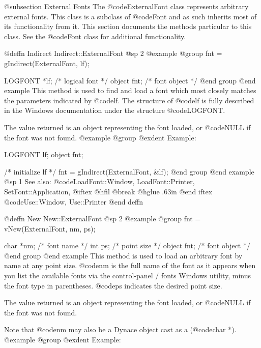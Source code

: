 @subsection External Fonts
The @code{ExternalFont} class represents arbitrary external fonts.  This
class is a subclass of @code{Font} and as such inherits most of its
functionality from it.  This section documents the methods particular to
this class.  See the @code{Font} class for additional functionality.









@deffn {Indirect} Indirect::ExternalFont
@sp 2
@example
@group
fnt = gIndirect(ExternalFont, lf);

LOGFONT *lf;    /*  logical font  */
object  fnt;    /*  font object   */
@end group
@end example
This method is used to find and load a font which most closely matches
the parameters indicated by @code{lf}.  The structure of @code{lf} is
fully described in the Windows documentation under the structure
@code{LOGFONT}.

The value returned is an object representing the font loaded, or
@code{NULL} if the font was not found.
@example
@group
@exdent Example:

LOGFONT lf;
object  fnt;

/*  initialize lf  */
fnt = gIndirect(ExternalFont, &lf);
@end group
@end example
@sp 1
See also:  @code{LoadFont::Window, LoadFont::Printer, SetFont::Application,}
@iftex
@hfil @break @hglue .63in 
@end iftex
@code{Use::Window, Use::Printer}
@end deffn










@deffn {New} New::ExternalFont
@sp 2
@example
@group
fnt = vNew(ExternalFont, nm, ps);

char    *nm;    /*  font name    */
int     ps;     /*  point size   */
object  fnt;    /*  font object  */
@end group
@end example
This method is used to load an arbitrary font by name at any point size.
@code{nm} is the full name of the font as it appears
when you list the available fonts via the control-panel / fonts Windows
utility, minus the font type in parentheses.  @code{ps} indicates the
desired point size.

The value returned is an object representing the font loaded, or
@code{NULL} if the font was not found.

Note that @code{nm} may also be a Dynace object cast as a (@code{char *}).
@example
@group
@exdent Example:

